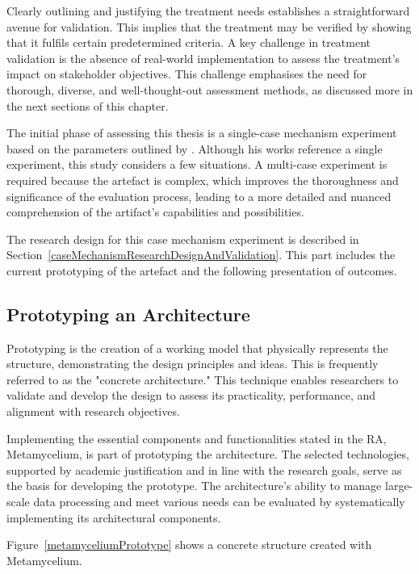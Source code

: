 \documentclass[journal]{IEEEtran}
\begin{document}
Clearly outlining and justifying the treatment needs establishes a straightforward avenue for validation. This implies that the treatment may be verified by showing that it fulfils certain predetermined criteria. A key challenge in treatment validation is the absence of real-world implementation to assess the treatment's impact on stakeholder objectives. This challenge emphasises the need for thorough, diverse, and well-thought-out assessment methods, as discussed more in the next sections of this chapter. 

The initial phase of assessing this thesis is a single-case mechanism experiment based on the parameters outlined by \cite{wieringa2014design}. Although his works reference a single experiment, this study considers a few situations. A multi-case experiment is required because the artefact is complex, which improves the thoroughness and significance of the evaluation process, leading to a more detailed and nuanced comprehension of the artifact's capabilities and possibilities. 

The research design for this case mechanism experiment is described in Section~\ref{caseMechanismResearchDesignAndValidation}. This part includes the current prototyping of the artefact and the following presentation of outcomes.


\subsection{Prototyping an Architecture}


Prototyping is the creation of a working model that physically represents the structure, demonstrating the design principles and ideas. This is frequently referred to as the "concrete architecture." This technique enables researchers to validate and develop the design to assess its practicality, performance, and alignment with research objectives.

Implementing the essential components and functionalities stated in the RA, Metamycelium, is part of prototyping the architecture. The selected technologies, supported by academic justification and in line with the research goals, serve as the basis for developing the prototype. The architecture's ability to manage large-scale data processing and meet various needs can be evaluated by systematically implementing its architectural components. 

Figure~\ref{metamyceliumPrototype} shows a concrete structure created with Metamycelium.
\end{document}
